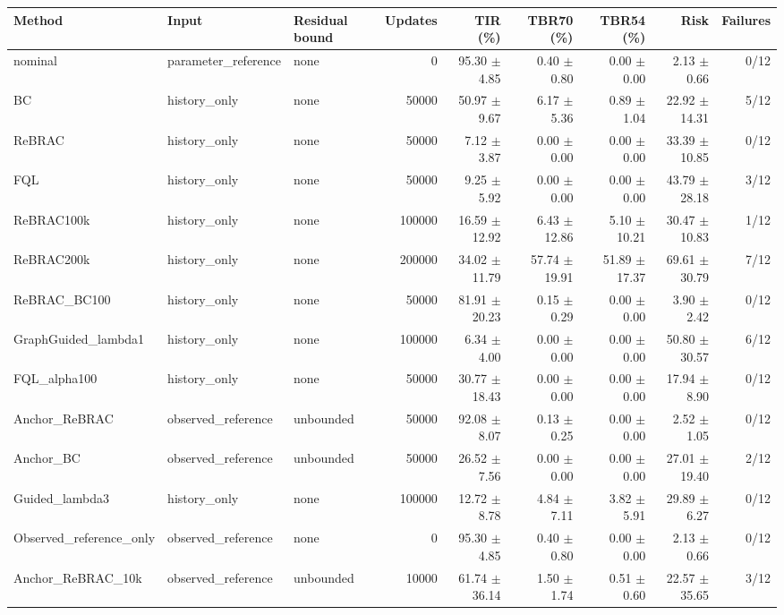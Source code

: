 \begin{tabular}{lllrrrrrr}
\hline
Method & Input & Residual bound & Updates & TIR (\%) & TBR70 (\%) & TBR54 (\%) & Risk & Failures \\
\hline
nominal & parameter\_reference & none & 0 & 95.30 $\pm$ 4.85 & 0.40 $\pm$ 0.80 & 0.00 $\pm$ 0.00 & 2.13 $\pm$ 0.66 & 0/12 \\
BC & history\_only & none & 50000 & 50.97 $\pm$ 9.67 & 6.17 $\pm$ 5.36 & 0.89 $\pm$ 1.04 & 22.92 $\pm$ 14.31 & 5/12 \\
ReBRAC & history\_only & none & 50000 & 7.12 $\pm$ 3.87 & 0.00 $\pm$ 0.00 & 0.00 $\pm$ 0.00 & 33.39 $\pm$ 10.85 & 0/12 \\
FQL & history\_only & none & 50000 & 9.25 $\pm$ 5.92 & 0.00 $\pm$ 0.00 & 0.00 $\pm$ 0.00 & 43.79 $\pm$ 28.18 & 3/12 \\
ReBRAC100k & history\_only & none & 100000 & 16.59 $\pm$ 12.92 & 6.43 $\pm$ 12.86 & 5.10 $\pm$ 10.21 & 30.47 $\pm$ 10.83 & 1/12 \\
ReBRAC200k & history\_only & none & 200000 & 34.02 $\pm$ 11.79 & 57.74 $\pm$ 19.91 & 51.89 $\pm$ 17.37 & 69.61 $\pm$ 30.79 & 7/12 \\
ReBRAC\_BC100 & history\_only & none & 50000 & 81.91 $\pm$ 20.23 & 0.15 $\pm$ 0.29 & 0.00 $\pm$ 0.00 & 3.90 $\pm$ 2.42 & 0/12 \\
GraphGuided\_lambda1 & history\_only & none & 100000 & 6.34 $\pm$ 4.00 & 0.00 $\pm$ 0.00 & 0.00 $\pm$ 0.00 & 50.80 $\pm$ 30.57 & 6/12 \\
FQL\_alpha100 & history\_only & none & 50000 & 30.77 $\pm$ 18.43 & 0.00 $\pm$ 0.00 & 0.00 $\pm$ 0.00 & 17.94 $\pm$ 8.90 & 0/12 \\
Anchor\_ReBRAC & observed\_reference & unbounded & 50000 & 92.08 $\pm$ 8.07 & 0.13 $\pm$ 0.25 & 0.00 $\pm$ 0.00 & 2.52 $\pm$ 1.05 & 0/12 \\
Anchor\_BC & observed\_reference & unbounded & 50000 & 26.52 $\pm$ 7.56 & 0.00 $\pm$ 0.00 & 0.00 $\pm$ 0.00 & 27.01 $\pm$ 19.40 & 2/12 \\
Guided\_lambda3 & history\_only & none & 100000 & 12.72 $\pm$ 8.78 & 4.84 $\pm$ 7.11 & 3.82 $\pm$ 5.91 & 29.89 $\pm$ 6.27 & 0/12 \\
Observed\_reference\_only & observed\_reference & none & 0 & 95.30 $\pm$ 4.85 & 0.40 $\pm$ 0.80 & 0.00 $\pm$ 0.00 & 2.13 $\pm$ 0.66 & 0/12 \\
Anchor\_ReBRAC\_10k & observed\_reference & unbounded & 10000 & 61.74 $\pm$ 36.14 & 1.50 $\pm$ 1.74 & 0.51 $\pm$ 0.60 & 22.57 $\pm$ 35.65 & 3/12 \\

\end{tabular}

